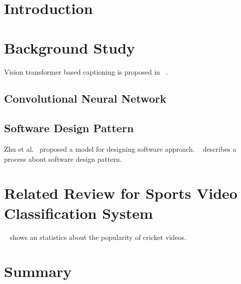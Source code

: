 \section{Introduction}
\lipsum[9-10]

\section{Background Study}
\lipsum[1-1]
Vision transformer based captioning is proposed in ~\cite{showattend}.

\subsection{Convolutional Neural Network}
\lipsum[4-6]

\subsection{Software Design Pattern}
Zhu et al.~\cite{zhu2015composability} proposed a model for designing software approach. ~\cite{designPatterns} describes a process about software design pattern.
\lipsum[1-5]

\section{Related Review for Sports Video Classification System}
\lipsum[1-8]
~\cite{cric_popularity} shows an statistics about the popularity of cricket videos.

\section{Summary}
\lipsum[2-3]